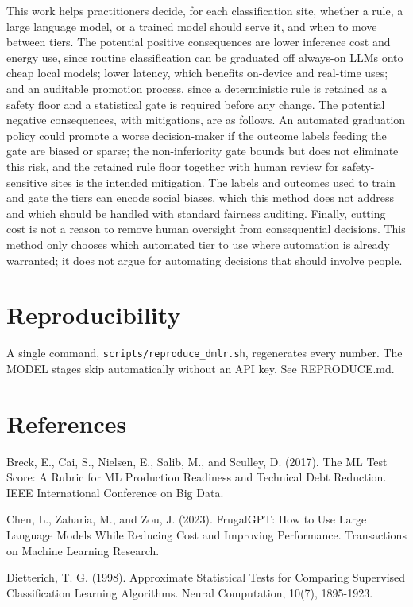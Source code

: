 This work helps practitioners decide, for each classification site,
whether a rule, a large language model, or a trained model should serve
it, and when to move between tiers. The potential positive consequences
are lower inference cost and energy use, since routine classification
can be graduated off always-on LLMs onto cheap local models; lower
latency, which benefits on-device and real-time uses; and an auditable
promotion process, since a deterministic rule is retained as a safety
floor and a statistical gate is required before any change. The
potential negative consequences, with mitigations, are as follows. An
automated graduation policy could promote a worse decision-maker if the
outcome labels feeding the gate are biased or sparse; the
non-inferiority gate bounds but does not eliminate this risk, and the
retained rule floor together with human review for safety-sensitive
sites is the intended mitigation. The labels and outcomes used to train
and gate the tiers can encode social biases, which this method does not
address and which should be handled with standard fairness auditing.
Finally, cutting cost is not a reason to remove human oversight from
consequential decisions. This method only chooses which automated tier
to use where automation is already warranted; it does not argue for
automating decisions that should involve people.

\section{Reproducibility}\label{reproducibility}

A single command, \texttt{scripts/reproduce\_dmlr.sh}, regenerates every
number. The MODEL stages skip automatically without an API key. See
REPRODUCE.md.

\section{References}\label{references}

Breck, E., Cai, S., Nielsen, E., Salib, M., and Sculley, D. (2017). The
ML Test Score: A Rubric for ML Production Readiness and Technical Debt
Reduction. IEEE International Conference on Big Data.

Chen, L., Zaharia, M., and Zou, J. (2023). FrugalGPT: How to Use Large
Language Models While Reducing Cost and Improving Performance.
Transactions on Machine Learning Research.

Dietterich, T. G. (1998). Approximate Statistical Tests for Comparing
Supervised Classification Learning Algorithms. Neural Computation,
10(7), 1895-1923.


